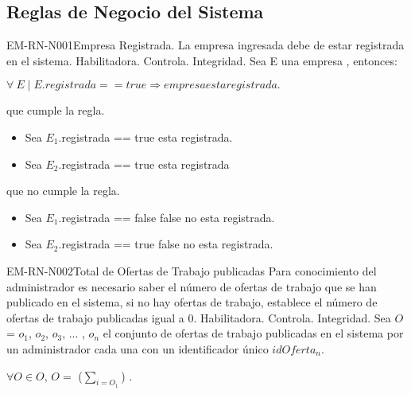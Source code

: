 \subsection{Reglas de Negocio del Sistema}

\begin{BussinesRule}{EM-RN-N001}{Empresa Registrada.} 
	\BRitem[Descripción:] La empresa ingresada debe de estar registrada en el sistema. 
	\BRitem[Tipo:] Habilitadora.
	\BRitem[Nivel:] Controla.
	\BRitem[Clase:] Integridad.
	\BRitem[Sentenia: ] Sea E una empresa , entonces:
	\begin{center}
		$\forall \: E  \mid E.registrada == true \Rightarrow empresa esta registrada.$
	\end{center}
	 que cumple la regla.
		\begin{itemize}
			\item Sea $E_{1}$.registrada == true esta registrada.
			\item Sea $E_{2}$.registrada == true esta registrada
		\end{itemize}
	 que no cumple la regla.
		\begin{itemize}
			\item Sea $E_{1}$.registrada == false false no esta registrada. 
			\item Sea $E_{2}$.registrada == true false no esta registrada.
		\end{itemize}
\end{BussinesRule}

\begin{BussinesRule}{EM-RN-N002}{Total de Ofertas de Trabajo publicadas} 
	\BRitem[Descripción:] Para conocimiento del administrador es necesario saber el número de ofertas de trabajo que se han publicado en el sistema, si no hay ofertas de trabajo, establece el número de ofertas de trabajo publicadas igual a 0. 
	\BRitem[Tipo:] Habilitadora.
	\BRitem[Nivel:] Controla.
	\BRitem[Clase:] Integridad.
	\BRitem[Sentenia: ] Sea $O$ = {$o_{1}$, $o_{2}$, $o_{3}$, ... , $o_{n}$} el conjunto de ofertas de trabajo publicadas en el sistema por un administrador cada una con un identificador único $idOferta_{n}$.
	\begin{center}
		$\forall O \in O$, $O=$ ($ \sum_{i=O_1} $) .
	\end{center}
\end{BussinesRule}
	
